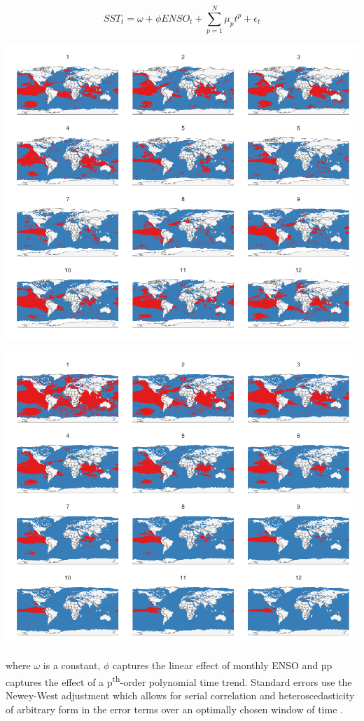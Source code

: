 \documentclass[]{article}
\begin{document}
\[SST_t = \omega + \phi ENSO_t + \sum_{p = 1}^{N}{\mu_pt^p} + \epsilon_t\]

\includegraphics{Oremus_Villasenor-Derbez_files/figure-latex/unnamed-chunk-8-1.pdf}

\includegraphics{Oremus_Villasenor-Derbez_files/figure-latex/unnamed-chunk-9-1.pdf}

where \(\omega\) is a constant, \(\phi\) captures the linear effect of
monthly ENSO and µp captures the effect of a p\textsuperscript{th}-order
polynomial time trend. Standard errors use the Newey-West adjustment
which allows for serial correlation and heteroscedasticity of arbitrary
form in the error terms over an optimally chosen window of time
\citep{newey_1987,newey_1994}.
\end{document}
